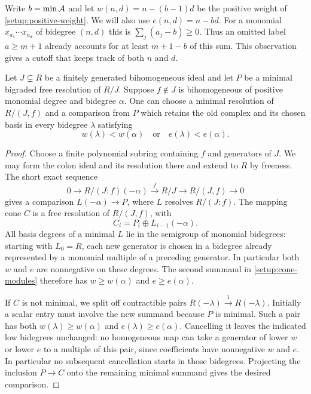 Write $b=\min\mathcal A$ and let $w(n,d)=n-(b-1)d$ be the positive weight of
\eqref{setup:positive-weight}. We will also use $e(n,d)=n-bd$.
For a monomial $x_{a_1}\cdots x_{a_d}$ of bidegree $(n,d)$ this is
$\sum_j(a_j-b)\ge0$. Thus an omitted label $a\ge m+1$ already accounts for
at least $m+1-b$ of this sum. This observation gives a cutoff that keeps
track of both $n$ and $d$.

\begin{lemma}\label{setup:mapping-cone}
Let $J\subsetneq R$ be a finitely generated bihomogeneous ideal and
let $P$ be a minimal bigraded free resolution of $R/J$. Suppose
$f\notin J$ is bihomogeneous of positive monomial degree and bidegree $\alpha$.
One can choose a minimal resolution of $R/(J,f)$ and a comparison
from $P$ which retains the old complex and its chosen basis in every
bidegree $\lambda$ satisfying
\[
 w(\lambda)<w(\alpha)\quad\text{or}\quad e(\lambda)<e(\alpha).
\]
\end{lemma}
\begin{proof}
Choose a finite polynomial subring containing $f$ and generators of
$J$. We may form the colon ideal and its resolution there and extend
to $R$ by freeness. The short exact sequence
\[
 0\longrightarrow R/(J:f)(-\alpha)
 \xrightarrow{\ f\ }R/J\longrightarrow R/(J,f)\longrightarrow0
\]
gives a comparison $L(-\alpha)\to P$, where $L$ resolves $R/(J:f)$.
The mapping cone $C$ is a free resolution of $R/(J,f)$, with
\begin{equation}\label{setup:cone-modules}
 C_i=P_i\oplus L_{i-1}(-\alpha).
\end{equation}
All basis degrees of a minimal $L$ lie in the semigroup of monomial
bidegrees: starting with $L_0=R$, each new generator is chosen in a
bidegree already represented by a monomial multiple of a preceding
generator. In particular both $w$ and $e$ are nonnegative on these
degrees. The second summand in \eqref{setup:cone-modules} therefore
has $w\ge w(\alpha)$ and $e\ge e(\alpha)$.

If $C$ is not minimal, we split off contractible pairs
$R(-\lambda)\xrightarrow{1}R(-\lambda)$. Initially a scalar entry
must involve the new summand because $P$ is minimal. Such a pair
has both $w(\lambda)\ge w(\alpha)$ and $e(\lambda)\ge e(\alpha)$.
Cancelling it leaves the indicated low bidegrees unchanged: no
homogeneous map can take a generator of lower $w$ or lower $e$
to a multiple of this pair, since coefficients have nonnegative
$w$ and $e$. In particular no subsequent cancellation starts in
those bidegrees. Projecting the inclusion $P\to C$ onto the remaining
minimal summand gives the desired comparison.
\end{proof}

